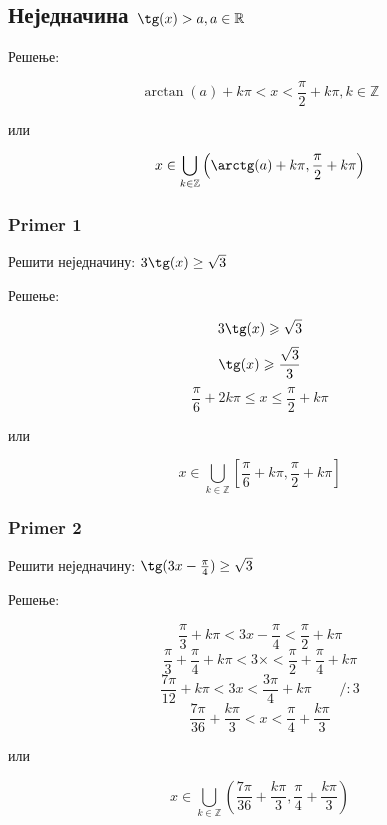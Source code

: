 \documentclass[../diplomski.tex]{subfiles}
\begin{document}
\subsection{Неједначина $\tg(x)>a,a\in\mathbb{R}$}

Решење:



\[\arctan(a)+k\pi<x<\frac{\pi}{2}+k\pi,k\in\mathbb{Z}\]
\centerline{или}
\[x\in\bigcup_{k\in\mathbb{Z}}\left(\arctg(a)+k\pi,\frac{\pi}{2}+k\pi\right)\]

\subsubsection{Primer 1}

Решити неједначину: $3\tg(x)\ge\sqrt3$

Решење:



\[3\tg(x)\geqslant\sqrt{3}\]
\[\tg(x)\geqslant\frac{\sqrt{3}}{3}\]
\[\frac{\pi}{6}+2k\pi\leqslant x\leqslant\frac{\pi}{2}+k\pi\]
\centerline{или}
\[x\in\bigcup_{k\in\mathbb{Z}}\left[\frac{\pi}{6}+k\pi,\frac{\pi}{2}+k\pi\right]\]

\subsubsection{Primer 2}

Решити неједначину: $\tg(3x-\frac{\pi}{4})\ge\sqrt3$

Решење:

\begin{multicols}{2}

\[\frac{\pi}{3}+k\pi<3x-\frac{\pi}{4}<\frac{\pi}{2}+k\pi\]
\[\frac{\pi}{3}+\frac{\pi}{4}+k\pi<3\times<\frac{\pi}{2}+\frac{\pi}{4}+k\pi\]
\[\frac{7\pi}{12}+k\pi<3x<\frac{3\pi}{4}+k\pi\qquad/:3\]
\[\frac{7\pi}{36}+\frac{k\pi}{3}<x<\frac{\pi}{4}+\frac{k\pi}{3}\]
\centerline{или}
\[x\in\bigcup_{k\in\mathbb{Z}}\left(\frac{7\pi}{36}+\frac{k\pi}{3},\frac{\pi}{4}+\frac{k\pi}{3}\right)\]

\columnbreak




\end{multicols}
\end{document}
